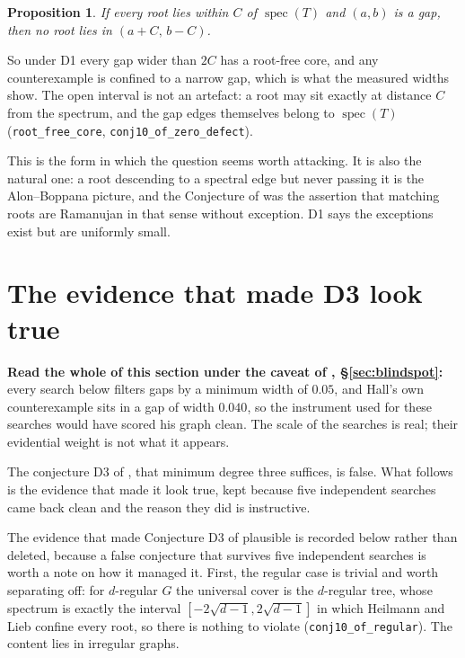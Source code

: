 \documentclass[11pt]{article}
\newtheorem{proposition}[theorem]{Proposition}
\theoremstyle{remark}
\begin{document}
\begin{proposition}\label{prop:core}
If every root lies within $C$ of $\operatorname{spec}(T)$ and $(a,b)$ is a gap, then no root
lies in $(a+C,\,b-C)$.
\end{proposition}

So under D1 every gap wider than $2C$ has a root-free core, and any counterexample is confined
to a narrow gap, which is what the measured widths show. The open interval is not an artefact:
a root may sit exactly at distance $C$ from the spectrum, and the gap edges themselves belong
to $\operatorname{spec}(T)$ (\texttt{root\_free\_core}, \texttt{conj10\_of\_zero\_defect}).

This is the form in which the question seems worth attacking. It is also the natural one: a
root descending to a spectral edge but never passing it is the Alon--Boppana picture, and
the Conjecture of \cite{PartI} was the assertion that matching roots are Ramanujan in that sense
without exception. D1 says the exceptions exist but are uniformly small.


\section{The evidence that made D3 look true}

\textbf{Read the whole of this section under the caveat of \cite{PartI}, \S\ref{sec:blindspot}:}
every search below filters gaps by a minimum width of $0.05$, and Hall's own counterexample sits in
a gap of width $0.040$, so the instrument used for these searches would have scored his graph clean.
The scale of the searches is real; their evidential weight is not what it appears.

The conjecture D3 of \cite{PartI}, that minimum degree three suffices, is false. What follows
is the evidence that made it look true, kept because five independent searches came back clean
and the reason they did is instructive.

The evidence that made Conjecture D3 of \cite{PartI} plausible is recorded below rather than
deleted, because a false conjecture that survives five independent searches is worth a note on
how it managed it. First, the regular case is trivial and worth separating
off: for $d$-regular $G$ the universal cover is the $d$-regular tree, whose spectrum is exactly
the interval $[-2\sqrt{d-1},2\sqrt{d-1}]$ in which Heilmann and Lieb confine every root, so there
is nothing to violate (\texttt{conj10\_of\_regular}). The content lies in irregular graphs.
\end{document}
